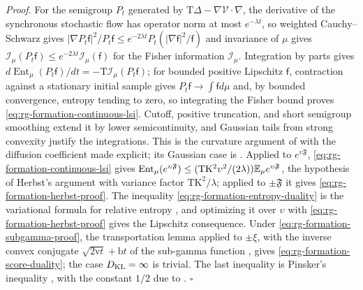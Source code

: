 \noindent\emph{Proof.}
For the semigroup \(P_t\) generated by
\(\mathrm T\Delta-\nabla\mathcal V\cdot\nabla\), the derivative of the
synchronous stochastic flow has operator norm at most \(e^{-\lambda t}\), so
weighted Cauchy--Schwarz gives
\(|\nabla P_t\mathsf f|^2/P_t\mathsf f\le e^{-2\lambda t}P_t(|\nabla\mathsf f|^2/\mathsf f)\)
and invariance of \(\mu\) gives
\(\mathcal I_\mu(P_t\mathsf f)\le e^{-2\lambda t}\mathcal I_\mu(\mathsf f)\) for
the Fisher information \(\mathcal I_\mu\). Integration by parts gives
\(d\operatorname{Ent}_\mu(P_t\mathsf f)/dt=-\mathrm T\mathcal I_\mu(P_t\mathsf f)\);
for bounded positive Lipschitz \(\mathsf f\), contraction against a stationary
initial sample gives \(P_t\mathsf f\to\int\mathsf f d\mu\) and, by bounded
convergence, entropy tending to zero, so integrating the Fisher bound proves
\cref{eq:rg-formation-continuous-lsi}. Cutoff, positive truncation, and short
semigroup smoothing extend it by lower semicontinuity, and Gaussian tails from
strong convexity justify the integrations. This is the curvature argument of
\citet[pp.~187, 194--200]{BakryEmery1985} with the diffusion coefficient made
explicit; its Gaussian case is \citet[Thm.~5.4]{BoucheronLugosiMassart2013}.
Applied to \(e^{\upsilon\mathfrak F}\), \cref{eq:rg-formation-continuous-lsi}
gives \(\operatorname{Ent}_\mu(e^{\upsilon\mathfrak F})\le
(\mathrm T\mathrm K^2\upsilon^2/(2\lambda))\mathbb E_\mu e^{\upsilon\mathfrak F}\), the
hypothesis of Herbst's argument \citep[Prop.~6.1]{BoucheronLugosiMassart2013}
with variance factor \(\mathrm T\mathrm K^2/\lambda\); applied to
\(\pm\mathfrak F\) it gives \cref{eq:rg-formation-herbst-proof}. The inequality
\cref{eq:rg-formation-entropy-duality} is the variational formula for relative
entropy \citep[Cor.~4.15]{BoucheronLugosiMassart2013}, and optimizing it over
\(\upsilon\) with \cref{eq:rg-formation-herbst-proof} gives the Lipschitz
consequence. Under \cref{eq:rg-formation-subgamma-proof}, the transportation
lemma \citep[Lemma~4.18]{BoucheronLugosiMassart2013} applied to \(\pm\xi\),
with the inverse convex conjugate \(\sqrt{2\mathrm vt}+\mathrm bt\) of the
sub-gamma function \citep[Sec.~2.4]{BoucheronLugosiMassart2013}, gives
\cref{eq:rg-formation-score-duality}; the case \(D_{\mathrm{KL}}=\infty\) is trivial. The
last inequality is Pinsker's inequality
\citep[Thm.~4.19]{BoucheronLugosiMassart2013}, with the constant \(1/2\) due to
\citet{Csiszar1967}. \hfill\(\square\)

